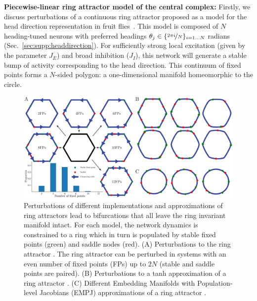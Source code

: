 \documentclass{article} %
\newcommand{\ptitle}[1]{\textbf{#1:}\xspace}
\newcounter{ct}
\theoremstyle{definition}
\theoremstyle{remark}
\begin{document}
\ptitle{Piecewise-linear ring attractor model of the central complex}
Firstly, we discuss perturbations of a continuous ring attractor proposed as a model for the head direction representation in fruit flies~\citep{Noorman2022}.
This model is composed of \(N\) heading-tuned neurons with preferred headings \(\theta_j \in \{\nicefrac{2\pi i}{N}\}_{i=1\dots N}\) radians (Sec.~\ref{sec:supp:headdirection}).
For sufficiently strong local excitation (given by the parameter \(J_E\)) and broad inhibition (\(J_I\)), this network will generate a stable bump of activity corresponding to the head direction.
This continuum of fixed points forms a \(N\)-sided polygon: a one-dimensional manifold homeomorphic to the circle.

\begin{figure}[tbhp]
     \centering
  \includegraphics[width=\textwidth]{bio_rings}
       \caption{ Perturbations of different implementations and approximations of ring attractors lead to bifurcations that all leave the ring invariant manifold intact. For each model, the network dynamics is constrained to a ring which in turn is populated by stable fixed points (green) and saddle nodes (red).
       (A) 	Perturbations to the ring attractor \citep{Noorman2022}. The ring attractor can be perturbed in systems with an even number of fixed points (FPs) up to \(2N\) (stable and saddle points are paired).
       (B) 	Perturbations to a tanh approximation of a ring attractor \citep{seeholzer2017efficient}.
       (C) 	Different Embedding Manifolds with Population-level Jacobians (EMPJ) approximations of a ring attractor \citep{pollock2020}.
       }\label{fig:bio_rings}
\end{figure}
\end{document}
